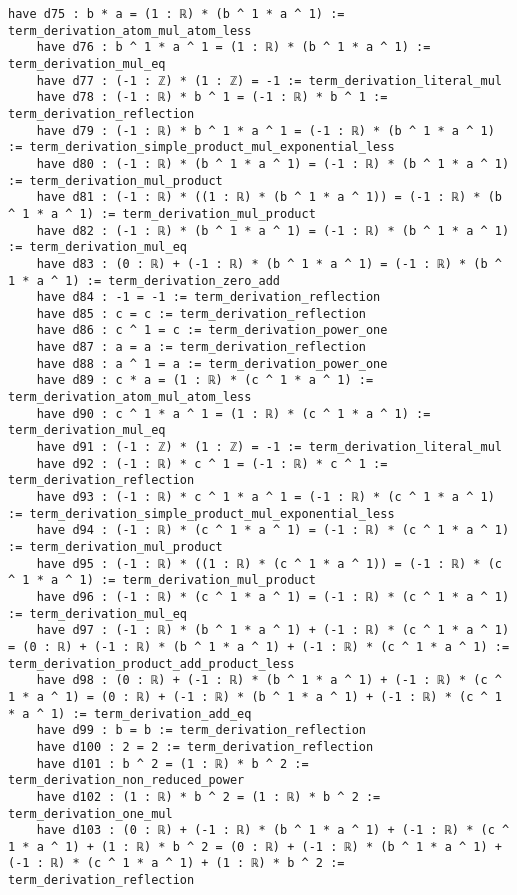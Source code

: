 \documentclass{article}
\begin{document}
\begin{tcolorbox}[colback=white!10, width=\linewidth]
\begin{lstlisting}[language=Lean4]
    have d75 : b * a = (1 : ℝ) * (b ^ 1 * a ^ 1) := term_derivation_atom_mul_atom_less
    have d76 : b ^ 1 * a ^ 1 = (1 : ℝ) * (b ^ 1 * a ^ 1) := term_derivation_mul_eq
    have d77 : (-1 : ℤ) * (1 : ℤ) = -1 := term_derivation_literal_mul
    have d78 : (-1 : ℝ) * b ^ 1 = (-1 : ℝ) * b ^ 1 := term_derivation_reflection
    have d79 : (-1 : ℝ) * b ^ 1 * a ^ 1 = (-1 : ℝ) * (b ^ 1 * a ^ 1) := term_derivation_simple_product_mul_exponential_less
    have d80 : (-1 : ℝ) * (b ^ 1 * a ^ 1) = (-1 : ℝ) * (b ^ 1 * a ^ 1) := term_derivation_mul_product
    have d81 : (-1 : ℝ) * ((1 : ℝ) * (b ^ 1 * a ^ 1)) = (-1 : ℝ) * (b ^ 1 * a ^ 1) := term_derivation_mul_product
    have d82 : (-1 : ℝ) * (b ^ 1 * a ^ 1) = (-1 : ℝ) * (b ^ 1 * a ^ 1) := term_derivation_mul_eq
    have d83 : (0 : ℝ) + (-1 : ℝ) * (b ^ 1 * a ^ 1) = (-1 : ℝ) * (b ^ 1 * a ^ 1) := term_derivation_zero_add
    have d84 : -1 = -1 := term_derivation_reflection
    have d85 : c = c := term_derivation_reflection
    have d86 : c ^ 1 = c := term_derivation_power_one
    have d87 : a = a := term_derivation_reflection
    have d88 : a ^ 1 = a := term_derivation_power_one
    have d89 : c * a = (1 : ℝ) * (c ^ 1 * a ^ 1) := term_derivation_atom_mul_atom_less
    have d90 : c ^ 1 * a ^ 1 = (1 : ℝ) * (c ^ 1 * a ^ 1) := term_derivation_mul_eq
    have d91 : (-1 : ℤ) * (1 : ℤ) = -1 := term_derivation_literal_mul
    have d92 : (-1 : ℝ) * c ^ 1 = (-1 : ℝ) * c ^ 1 := term_derivation_reflection
    have d93 : (-1 : ℝ) * c ^ 1 * a ^ 1 = (-1 : ℝ) * (c ^ 1 * a ^ 1) := term_derivation_simple_product_mul_exponential_less
    have d94 : (-1 : ℝ) * (c ^ 1 * a ^ 1) = (-1 : ℝ) * (c ^ 1 * a ^ 1) := term_derivation_mul_product
    have d95 : (-1 : ℝ) * ((1 : ℝ) * (c ^ 1 * a ^ 1)) = (-1 : ℝ) * (c ^ 1 * a ^ 1) := term_derivation_mul_product
    have d96 : (-1 : ℝ) * (c ^ 1 * a ^ 1) = (-1 : ℝ) * (c ^ 1 * a ^ 1) := term_derivation_mul_eq
    have d97 : (-1 : ℝ) * (b ^ 1 * a ^ 1) + (-1 : ℝ) * (c ^ 1 * a ^ 1) = (0 : ℝ) + (-1 : ℝ) * (b ^ 1 * a ^ 1) + (-1 : ℝ) * (c ^ 1 * a ^ 1) := term_derivation_product_add_product_less
    have d98 : (0 : ℝ) + (-1 : ℝ) * (b ^ 1 * a ^ 1) + (-1 : ℝ) * (c ^ 1 * a ^ 1) = (0 : ℝ) + (-1 : ℝ) * (b ^ 1 * a ^ 1) + (-1 : ℝ) * (c ^ 1 * a ^ 1) := term_derivation_add_eq
    have d99 : b = b := term_derivation_reflection
    have d100 : 2 = 2 := term_derivation_reflection
    have d101 : b ^ 2 = (1 : ℝ) * b ^ 2 := term_derivation_non_reduced_power
    have d102 : (1 : ℝ) * b ^ 2 = (1 : ℝ) * b ^ 2 := term_derivation_one_mul
    have d103 : (0 : ℝ) + (-1 : ℝ) * (b ^ 1 * a ^ 1) + (-1 : ℝ) * (c ^ 1 * a ^ 1) + (1 : ℝ) * b ^ 2 = (0 : ℝ) + (-1 : ℝ) * (b ^ 1 * a ^ 1) + (-1 : ℝ) * (c ^ 1 * a ^ 1) + (1 : ℝ) * b ^ 2 := term_derivation_reflection

\end{lstlisting}
\end{tcolorbox}
\end{document}
